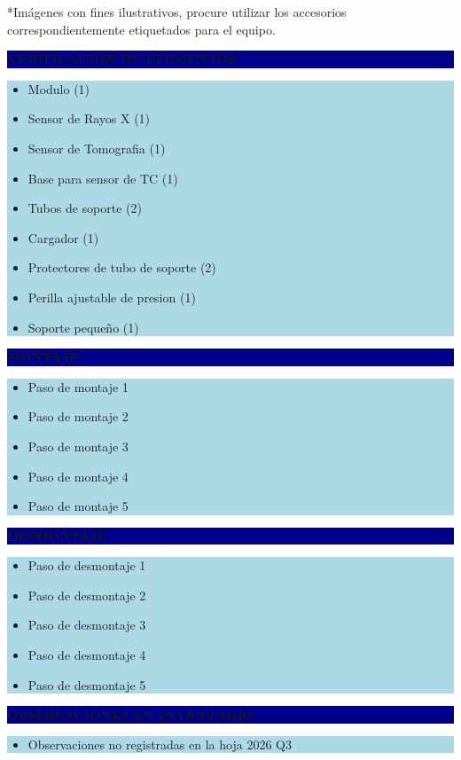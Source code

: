 \documentclass[11pt]{article}
\newcommand{\seccionbanda}[1]{%
  \vspace{0.6em}
  \noindent\colorbox{darkblue}{\parbox{\dimexpr\linewidth-2\fboxsep}{%
    \centering\color{white}\bfseries #1}}\par\vspace{0.6em}
}
\begin{document}
\vspace{0.5em}
\footnotesize{*Imágenes con fines ilustrativos, procure utilizar los accesorios correspondientemente etiquetados para el equipo.}
\normalsize

\newpage
\seccionbanda{VERIFICACIÓN DE ELEMENTOS}
\noindent\colorbox{lightblue}{\parbox{\dimexpr\linewidth-2\fboxsep\relax}{%
\begin{itemize}[label=$\square$, itemsep=4pt]
\item Modulo (1)
\item Sensor de Rayos X (1)
\item Sensor de Tomografia (1)
\item Base para sensor de TC (1)
\item Tubos de soporte (2)
\item Cargador (1)
\item Protectores de tubo de soporte (2)
\item Perilla ajustable de presion (1)
\item Soporte pequeño (1)
\end{itemize}
}}\par

\seccionbanda{MONTAJE}
\noindent\colorbox{lightblue}{\parbox{\dimexpr\linewidth-2\fboxsep\relax}{%
\begin{itemize}[label=$\square$, itemsep=4pt]
\item Paso de montaje 1
\item Paso de montaje 2
\item Paso de montaje 3
\item Paso de montaje 4
\item Paso de montaje 5
\end{itemize}
}}\par

\seccionbanda{DESMONTAJE}
\noindent\colorbox{lightblue}{\parbox{\dimexpr\linewidth-2\fboxsep\relax}{%
\begin{itemize}[label=$\square$, itemsep=4pt]
\item Paso de desmontaje 1
\item Paso de desmontaje 2
\item Paso de desmontaje 3
\item Paso de desmontaje 4
\item Paso de desmontaje 5
\end{itemize}
}}\par
\seccionbanda{OBSERVACIONES EN INVENTARIO}
\noindent\colorbox{lightblue}{\parbox{\dimexpr\linewidth-2\fboxsep\relax}{\begin{itemize}[itemsep=4pt]
\item Observaciones no registradas en la hoja 2026 Q3
\end{itemize}}}\par
\end{document}

